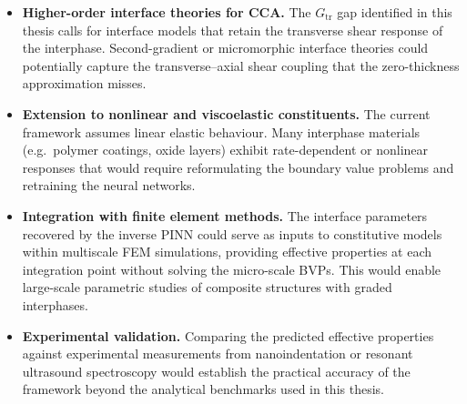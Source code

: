 \documentclass[oneside, 12pt, a4paper, bibliography=totoc]{book}
\begin{document}
\begin{itemize}
    \item \textbf{Higher-order interface theories for CCA.} The $G_{\text{tr}}$ gap identified in this thesis calls for interface models that retain the transverse shear response of the interphase. Second-gradient or micromorphic interface theories could potentially capture the transverse–axial shear coupling that the zero-thickness approximation misses.

    \item \textbf{Extension to nonlinear and viscoelastic constituents.} The current framework assumes linear elastic behaviour. Many interphase materials (e.g.\ polymer coatings, oxide layers) exhibit rate-dependent or nonlinear responses that would require reformulating the boundary value problems and retraining the neural networks.

    \item \textbf{Integration with finite element methods.} The interface parameters recovered by the inverse PINN could serve as inputs to constitutive models within multiscale FEM simulations, providing effective properties at each integration point without solving the micro-scale BVPs. This would enable large-scale parametric studies of composite structures with graded interphases.

    \item \textbf{Experimental validation.} Comparing the predicted effective properties against experimental measurements from nanoindentation or resonant ultrasound spectroscopy would establish the practical accuracy of the framework beyond the analytical benchmarks used in this thesis.

\end{itemize}

\backmatter

\printbibliography[heading=bibintoc, title={References}]
\end{document}
